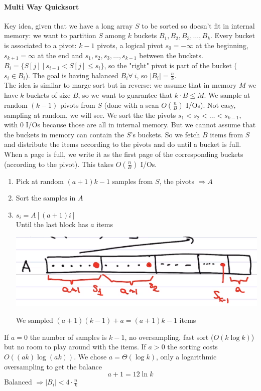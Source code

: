 \documentclass[10pt]{report}
\begin{document}
\paragraph{Multi Way Quicksort} Key idea, given that we have a long array $S$ to be sorted so doesn't fit in internal memory: we want to partition $S$ among $k$ buckets $B_1,B_2,B_3,\ldots,B_k$. Every bucket is associated to a pivot: $k-1$ pivots, a logical pivot $s_0 = -\infty$ at the beginning, $s_{k+1} = \infty$ at the end and $s_1,s_2,s_3,\ldots,s_{k-1}$ between the buckets.\\
$B_i=\{S[j]\:|\: s_{i-1} < S[j] \leq s_i\}$, so the "right" pivot is part of the bucket ($s_i \in B_i$). The goal is having balanced $B_i \forall\:i$, so $|B_i| = \frac{n}{k}$.\\
The idea is similar to marge sort but in reverse: we assume that in memory $M$ we have $k$ buckets of size $B$, so we want to guarantee that $k\cdot B \leq M$. We sample at random $(k-1)$ pivots from $S$ (done with a scan $O(\frac{n}{B})$ I/Os). Not easy, sampling at random, we will see. We sort the the pivots $s_1 < s_2 < \ldots < s_{k-1}$, with 0 I/Os because those are all in internal memory. But we cannot assume that the buckets in memory can contain the $S$'s buckets. So we fetch $B$ items from $S$ and distribute the items according to the pivots and do until a bucket is full. When a page is full, we write it as the first page of the corresponding buckets (according to the pivot). This takes $O(\frac{n}{B})$ I/Os.
\begin{enumerate}
	\item Pick at random $(a + 1)k - 1$ samples from $S$, the pivots $\Rightarrow A$
	\item Sort the samples in $A$
	\item $s_i = A[(a+1)i]$\\
	Until the last block has $a$ items
	\begin{center}
		\includegraphics[scale=0.5]{3.png}
	\end{center}
	We sampled $(a+1)(k-1) + a = (a+1)k -1$ items
\end{enumerate}
If $a = 0$ the number of samples is $k-1$, no oversampling, fast sort ($O(k\log k)$) but no room to play around with the items. If $a > 0$ the sorting costs $O((ak)\log (ak))$. We chose $a = \Theta(\log k)$, only a logarithmic oversampling to get the balance $$a + 1 = 12\ln k$$ Balanced $\Rightarrow |B_i| < 4\cdot\frac{n}{k}$
\end{document}
